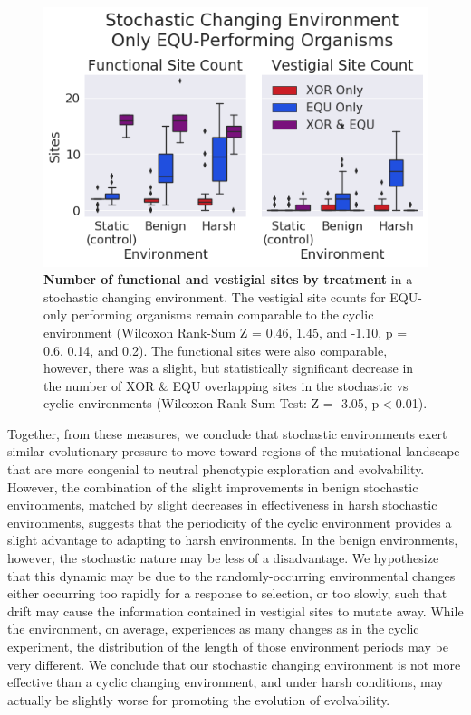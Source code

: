 \documentclass[PhD]{msu-thesis}
\begin{document}
	\begin{figure}[!h]
	\includegraphics[width=0.75\columnwidth]{figures/CE/CSE_func_vest__filtered__box.png}
	\caption{\textbf{Number of functional and vestigial sites by treatment} in a stochastic changing environment. The vestigial site counts for EQU-only performing organisms remain comparable to the cyclic environment (Wilcoxon Rank-Sum Z = 0.46, 1.45, and -1.10, p = 0.6, 0.14, and 0.2). The functional sites were also comparable, however, there was a slight, but statistically significant decrease in the number of XOR \& EQU overlapping sites in the stochastic vs cyclic environments (Wilcoxon Rank-Sum Test: Z = -3.05, p$<$0.01).
	}
	\label{fig:CSE_func_vestigial} %
	\end{figure}

Together, from these measures, we conclude that stochastic environments exert similar evolutionary pressure to move toward regions of the mutational landscape that are more congenial to neutral phenotypic exploration and evolvability. However, the combination of the slight improvements in benign stochastic environments, matched by slight decreases in effectiveness in harsh stochastic environments, suggests that the periodicity of the cyclic environment provides a slight advantage to adapting to harsh environments. In the benign environments, however, the stochastic nature may be less of a disadvantage. We hypothesize that this dynamic may be due to the randomly-occurring environmental changes either occurring too rapidly for a response to selection, or too slowly, such that drift may cause the information contained in vestigial sites to mutate away. While the environment, on average, experiences as many changes as in the cyclic experiment, the distribution of the length of those environment periods may be very different. We conclude that our stochastic changing environment is not more effective than a cyclic changing environment, and under harsh conditions, may actually be slightly worse for promoting the evolution of evolvability.
\end{document}
